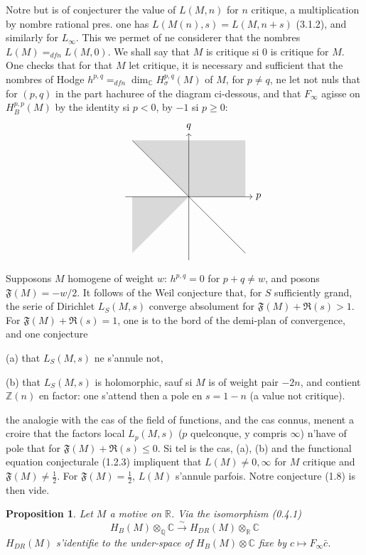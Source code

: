 \documentclass[12pt,a4paper]{article}
\theoremstyle{plain}
\newtheorem{proposition}[theorem]{Proposition}
\theoremstyle{definition}
\theoremstyle{remark}
\newcommand{\Q}{\mathbb{Q}}
\newcommand{\R}{\mathbb{R}}
\newcommand{\C}{\mathbb{C}}
\newcommand{\Z}{\mathbb{Z}}
\begin{document}
Notre but is of conjecturer the value of $L(M, n)$ for $n$ critique, a multiplication by
nombre rational pres. one has $L(M(n), s) = L(M, n+s)$ (3.1.2), and similarly for $L_\infty$.
This we permet of ne considerer that the nombres $L(M) =_{dfn} L(M, 0)$. We shall say that
$M$ is critique si $0$ is critique for $M$. One checks that for that $M$ let critique, it is necessary and sufficient that the nombres of Hodge $h^{p,q} =_{dfn} \dim_\C H_\sigma^{p,q}(M)$ of $M$, for
$p \neq q$, ne let not nuls that for $(p,q)$ in the part hachuree of the diagram
ci-dessous, and that $F_\infty$ agisse on $H_B^{p,p}(M)$ by the identity si $p < 0$, by $-1$ si
$p \geq 0$:
\begin{equation}\label{eq:1.3.1}
\begin{matrix}
\\
\end{matrix}
\qquad
\begin{tikzpicture}[scale=0.5,baseline]
\fill[gray!30] (-4,4) -- (0,0) -- (4,0) -- (4,4) -- cycle;
\fill[gray!30] (-4,-4) -- (0,0) -- (-4,0) -- cycle;
\draw[->] (-4.5,0) -- (4.5,0) node[right] {$p$};
\draw[->] (0,-4.5) -- (0,4.5) node[above] {$q$};
\draw (-4,4) -- (4,-4);
\end{tikzpicture}
\end{equation}

Supposons $M$ homogene of weight $w$: $h^{p,q} = 0$ for $p + q \neq w$, and posons
$\mathfrak{F}(M) = -w/2$. It follows of the Weil conjecture that, for $S$ sufficiently grand, the serie
of Dirichlet $L_S(M, s)$ converge absolument for $\mathfrak{F}(M) + \Re(s) > 1$. For
$\mathfrak{F}(M) + \Re(s) = 1$, one is to the bord of the demi-plan of convergence, and one conjecture

(a) that $L_S(M, s)$ ne s'annule not,

(b) that $L_S(M, s)$ is holomorphic, sauf si $M$ is of weight pair $-2n$, and contient
$\Z(n)$ en factor: one s'attend then a pole en $s = 1-n$ (a value not critique).

the analogie with the cas of the field of functions, and the cas connus, menent a croire
that the factors local $L_p(M, s)$ ($p$ quelconque, y compris $\infty$) n'have of pole that
for $\mathfrak{F}(M) + \Re(s) \leq 0$. Si tel is the cas, (a), (b) and the functional equation
conjecturale (1.2.3) impliquent that $L(M) \neq 0, \infty$ for $M$ critique and $\mathfrak{F}(M) \neq \tfrac{1}{2}$.
For $\mathfrak{F}(M) = \tfrac{1}{2}$, $L(M)$ s'annule parfois. Notre conjecture (1.8) is then vide.

\begin{proposition}\label{prop:1.4}
Let $M$ a motive on $\R$. Via the isomorphism (0.4.1)
\[
H_B(M) \otimes_\Q \C \xrightarrow{\sim} H_{DR}(M) \otimes_\R \C
\]
$H_{DR}(M)$ s'identifie to the under-space of $H_B(M) \otimes \C$ fixe by $c \mapsto F_\infty \bar{c}$.
\end{proposition}
\end{document}
